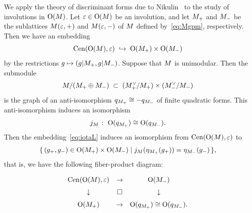 \documentclass{amsart} %
\begin{document}
%
%
%
We apply the theory of discriminant forms
due to Nikulin~\cite{MR525944}
to the study of involutions in $\mathord{\mathrm{O}}(M)$.
Let $\varepsilon \in \mathord{\mathrm{O}}(M)$ be an involution, and 
let $M_+$ and $M_-$ be the sublattices
$M(\varepsilon, +)$ and $M(\varepsilon, -)$ of $M$  defined by~\eqref{eq:Mgpm}, respectively.
Then we have an embedding
%
\begin{equation}\label{eq:iotaL}
\mathrm{Cen}(\mathord{\mathrm{O}}(M), \varepsilon)\;\hookrightarrow\; \mathord{\mathrm{O}}(M_+)\times \mathord{\mathrm{O}}(M_-)
\end{equation}
%
by the restrictions $g\mapsto (g|M_+, g|M_-)$.
Suppose that $M$ is unimodular.
Then the submodule
\[
M/(M_+\oplus M_-) \;\subset\; (M_+^{\vee}/M_+)\times (M_-^{\vee}/M_-)
\]
is the graph of an anti-isomorphism
$q_{M_+} \cong -q_{M_-}$
of finite quadratic forms.
This anti-isomorphism
induces an isomorphism
\[
j_M\;\colon\; \mathord{\mathrm{O}}(q_{M_+}) \cong \mathord{\mathrm{O}}(q_{M_-}).
\]
Then the embedding~\eqref{eq:iotaL} induces an isomorphism from $\mathrm{Cen}(\mathord{\mathrm{O}}(M), \varepsilon)$ to 
%
\begin{equation*}\label{eq:CenL}
\{\,{(g_{+}, g_{-})\in \mathord{\mathrm{O}}(M_+)\times \mathord{\mathrm{O}}(M_-)}\mid {j_M(\eta_{M_+}(g_{+}))=\eta_{M_-}(g_{-})} \,\},
\end{equation*}
%
that is, we have the following fiber-product diagram:
%
\begin{equation}\label{eq:groupfibprodCenvep}
\renewcommand{\arraystretch}{1.5}
\begin{array}{ccc}
\Cen(\OG(\dLat), \vep) &\to & \OG(\dLatminus) \\
\downarrow & \square& \downarrow \\
\OG(\dLatplus) & \to & \OG(q_{\dLatplus}) \cong \OG(q_{\dLatminus}).
\end{array}
\end{equation}
%
%
\end{document}
